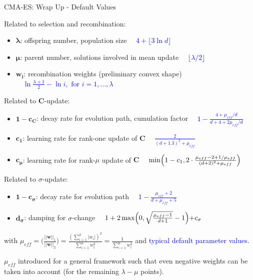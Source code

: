 \documentclass[11pt,compress,t,notes=noshow, xcolor=table]{beamer}
\begin{document}
\begin{vbframe}{CMA-ES: Wrap Up - Default Values} %
\scriptsize{
Related to selection and recombination:

\begin{itemize}
\item $\bm{\lambda}$: offspring number, population size \textcolor{blue}{$\quad 4 + \lfloor 3 \ln d\rfloor$}
\item $\bm{\mu}$: parent number, solutions involved in mean update \textcolor{blue}{$\quad \lfloor \lambda / 2\rfloor$}
\item $\bm{w_i}$: recombination weights (preliminary convex shape) \textcolor{blue}{$\quad \ln \frac{\lambda + 1}{2} - \ln i, \text{ for } i = 1, \dots, \lambda$}
\end{itemize}

Related to $\bm{C}$-update:

\begin{itemize}
\item $\bm{1-c_{\bm{C}}}$: decay rate for evolution path, cumulation factor \textcolor{blue}{$\quad 1- \frac{4+\mu_{eff}/d}{d+4+2\mu_{eff}/d}$}
\item $\bm{c_1}$: learning rate for rank-one update of $\bm{C}$ \textcolor{blue}{$\quad \frac{2}{(d+1.3)^2+\mu_{eff}}$}
\item $\bm{c_{\mu}}$: learning rate for rank-$\mu$ update of $\bm{C}$ \textcolor{blue}{$\quad \min\Bigl(1-c_1, 2\cdot \frac{\mu_{eff}-2+1/\mu_{eff}}{(d+2)^2+\mu_{eff}}\Bigl)$}
\end{itemize}

Related to $\sigma$-update:

\begin{itemize}
\item $\bm{1-c_{\sigma}}$: decay rate for evolution path \textcolor{blue}{$\quad 1- \frac{\mu_{eff}+2}{d+\mu_{eff}+5}$}
\item $\bm{d_{\sigma}}$: damping for $\sigma$-change \textcolor{blue}{$\quad 1+2 \max\Bigl(0, \sqrt{\frac{\mu_{eff}-1}{d+1}}-1\Bigl) + c_\sigma$}
\end{itemize}

with $\mu_{eff}=\bigl(\frac{||\bm{w}||_1}{||\bm{w}||_2}\bigl)=\frac{(\sum_{i=1}^\mu |w_i|)^2}{\sum_{i=1}^\mu w_i^2} = \frac{1}{\sum_{i=1}^\mu w_i^2}$ and \textcolor{blue}{typical default parameter values}.

$\mu_{eff}$ introduced for a general framework such that even negative weights can be taken into account (for the remaining $\lambda-\mu$ points).

}
\end{vbframe}
\end{document}
